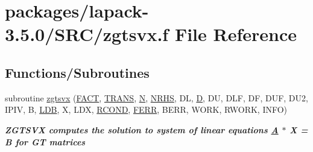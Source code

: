 \hypertarget{zgtsvx_8f}{}\section{packages/lapack-\/3.5.0/\+S\+R\+C/zgtsvx.f File Reference}
\label{zgtsvx_8f}
\subsection*{Functions/\+Subroutines}
\begin{DoxyCompactItemize}
\item 
subroutine \hyperlink{group__complex16GTsolve_ga0f8fa2a56d81bf3db97572afda73b61a}{zgtsvx} (\hyperlink{superlu__enum__consts_8h_af00a42ecad444bbda75cde1b64bd7e72a1b6692b56d378abb85bd49063721d034}{F\+A\+C\+T}, \hyperlink{superlu__enum__consts_8h_a0c4e17b2d5cea33f9991ccc6a6678d62a1f61e3015bfe0f0c2c3fda4c5a0cdf58}{T\+R\+A\+N\+S}, \hyperlink{polmisc_8c_a0240ac851181b84ac374872dc5434ee4}{N}, \hyperlink{example__user_8c_aa0138da002ce2a90360df2f521eb3198}{N\+R\+H\+S}, D\+L, \hyperlink{odrpack_8h_a7dae6ea403d00f3687f24a874e67d139}{D}, D\+U, D\+L\+F, D\+F, D\+U\+F, D\+U2, I\+P\+I\+V, B, \hyperlink{example__user_8c_a50e90a7104df172b5a89a06c47fcca04}{L\+D\+B}, X, L\+D\+X, \hyperlink{superlu__enum__consts_8h_af00a42ecad444bbda75cde1b64bd7e72a9b5c151728d8512307565994c89919d5}{R\+C\+O\+N\+D}, \hyperlink{superlu__enum__consts_8h_af00a42ecad444bbda75cde1b64bd7e72a78fd14d7abebae04095cfbe02928f153}{F\+E\+R\+R}, B\+E\+R\+R, W\+O\+R\+K, R\+W\+O\+R\+K, I\+N\+F\+O)
\begin{DoxyCompactList}\small\item\em {\bfseries  Z\+G\+T\+S\+V\+X computes the solution to system of linear equations \hyperlink{classA}{A} $\ast$ X = B for G\+T matrices {\bfseries  }}\end{DoxyCompactList}\end{DoxyCompactItemize}
